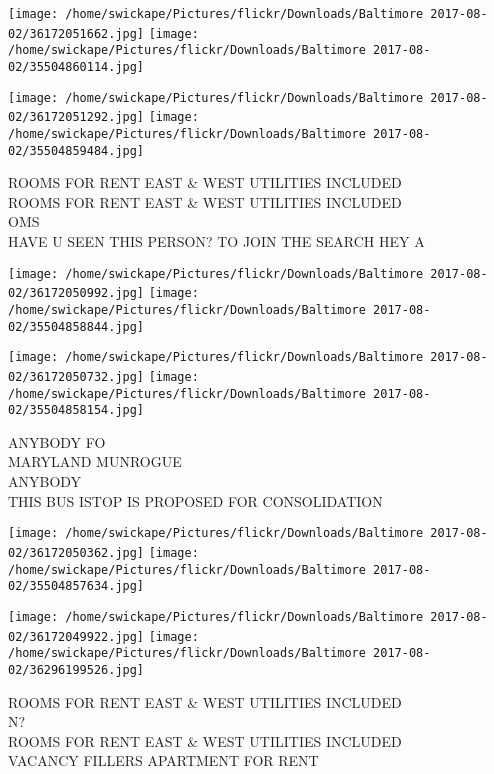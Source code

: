 \documentclass[10pt,letterpaper]{article}
\begin{document}
\texttt{[image: /home/swickape/Pictures/flickr/Downloads/Baltimore 2017-08-02/36172051662.jpg]}
\texttt{[image: /home/swickape/Pictures/flickr/Downloads/Baltimore 2017-08-02/35504860114.jpg]}

\texttt{[image: /home/swickape/Pictures/flickr/Downloads/Baltimore 2017-08-02/36172051292.jpg]}
\texttt{[image: /home/swickape/Pictures/flickr/Downloads/Baltimore 2017-08-02/35504859484.jpg]}

ROOMS FOR RENT EAST \& WEST UTILITIES INCLUDED\\
ROOMS FOR RENT EAST \& WEST UTILITIES INCLUDED\\
OMS\\
HAVE U SEEN THIS PERSON?  TO JOIN THE SEARCH HEY A\\
\pagebreak

\texttt{[image: /home/swickape/Pictures/flickr/Downloads/Baltimore 2017-08-02/36172050992.jpg]}
\texttt{[image: /home/swickape/Pictures/flickr/Downloads/Baltimore 2017-08-02/35504858844.jpg]}

\texttt{[image: /home/swickape/Pictures/flickr/Downloads/Baltimore 2017-08-02/36172050732.jpg]}
\texttt{[image: /home/swickape/Pictures/flickr/Downloads/Baltimore 2017-08-02/35504858154.jpg]}

ANYBODY FO\\
MARYLAND MUNROGUE\\
ANYBODY\\
THIS BUS ISTOP IS PROPOSED FOR CONSOLIDATION\\
\pagebreak

\texttt{[image: /home/swickape/Pictures/flickr/Downloads/Baltimore 2017-08-02/36172050362.jpg]}
\texttt{[image: /home/swickape/Pictures/flickr/Downloads/Baltimore 2017-08-02/35504857634.jpg]}

\texttt{[image: /home/swickape/Pictures/flickr/Downloads/Baltimore 2017-08-02/36172049922.jpg]}
\texttt{[image: /home/swickape/Pictures/flickr/Downloads/Baltimore 2017-08-02/36296199526.jpg]}

ROOMS FOR RENT EAST \& WEST UTILITIES INCLUDED\\
N?\\
ROOMS FOR RENT EAST \& WEST UTILITIES INCLUDED\\
VACANCY FILLERS APARTMENT FOR RENT\\
\pagebreak
\end{document}
